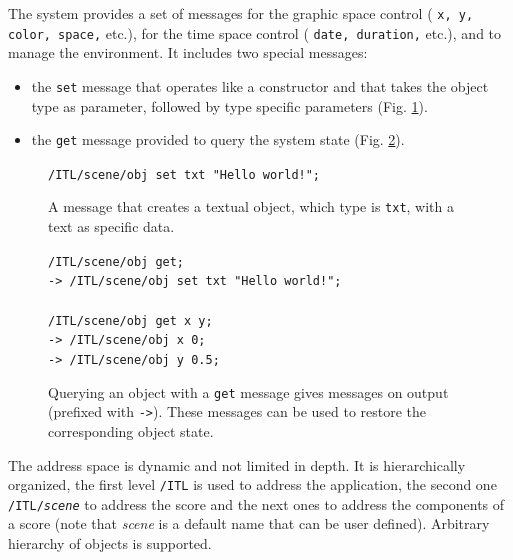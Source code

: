 \documentclass[11pt,a4paper]{article}
\newcommand{\OSC}[1]	{{\fontsize{10pt}{10pt} \selectfont\texttt{#1}}}
\newcommand{\tab}		{\hspace*{4mm}}
\newcommand{\sample}[1]	{\vspace{-0.2em}\begin{center}\colorbox{mygrey}{\begin{minipage}[t]{0.98\columnwidth} {\small \texttt{#1}}\end{minipage}}\end{center}}
\begin{document}
The system provides a set of messages for the graphic space control (\OSC{x, y, color, space,} etc.), for the time space control (\OSC{date, duration,} etc.), and to manage the environment. It includes two special messages:
\begin{itemize}
\item the \OSC{set} message that operates like a constructor and that takes the object type as parameter, followed by type specific parameters (Fig. \ref{fig:set}).
\item the \OSC{get} message provided to query the system state  (Fig. \ref{fig:get}).
\end{itemize}

\begin{figure}[ht]
\begin{center}
\sample{/ITL/scene/obj set txt "Hello world!";
}
\caption{A message that creates a textual object, which type is \OSC{txt}, with a text as specific data.}
\label{fig:set}
\end{center}
\end{figure}

\begin{figure}[ht]
\begin{center}
\sample{/ITL/scene/obj get;\\
\tab -> /ITL/scene/obj set txt "Hello world!";\\
\\
/ITL/scene/obj get x y;\\
\tab -> /ITL/scene/obj x 0;\\
\tab -> /ITL/scene/obj y 0.5;
}
\caption{Querying an object with a \OSC{get} message gives messages on output (prefixed with \OSC{->}). These messages can be used to restore the corresponding object state.}
\label{fig:get}
\end{center}
\end{figure}

The address space is dynamic and not limited in depth. It is hierarchically organized, the first level \OSC{/ITL} is used to address the application, the second one 
\OSC{/ITL/\textit{scene}} 
to address the score and the next ones to address the components of a score (note that \textit{scene} is a default name that can be user defined). Arbitrary hierarchy of objects is supported.

\end{document}
